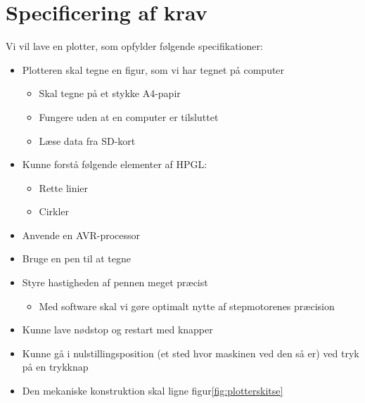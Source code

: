 \section{Specificering af krav}
\label{sc:specificering-af-krav}

Vi vil lave en plotter, som opfylder følgende specifikationer:

\begin{itemize} \firmlist
\item Plotteren skal tegne en figur, som vi har tegnet på computer
  \begin{itemize}
  \item Skal tegne på et stykke A4-papir
  \item Fungere uden at en computer er tilsluttet
  \item Læse data fra SD-kort
  \end{itemize}
\item Kunne forstå følgende elementer af HPGL:
  \begin{itemize}
  \item Rette linier
  \item Cirkler
  \end{itemize}
\item Anvende en AVR-processor
\item Bruge en pen til at tegne
\item Styre hastigheden af pennen meget præcist
  \begin{itemize}
  \item Med software skal vi gøre optimalt nytte af stepmotorenes præcision
  \end{itemize}
\item Kunne lave nødstop og restart med knapper
\item Kunne gå i nulstillingsposition (et sted hvor maskinen ved den
  så er) ved tryk på en trykknap
\item Den mekaniske konstruktion skal ligne figur\vref{fig:plotterskitse}
\end{itemize}
